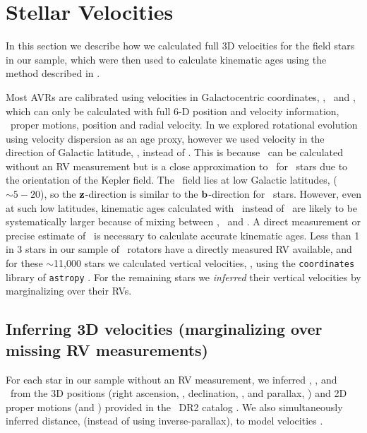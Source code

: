 \section{Stellar Velocities}
\label{sec:velocities}

In this section we describe how we calculated full 3D velocities for the field
stars in our sample, which were then used to calculate kinematic ages using
the method described in \citet{lu2021}.

Most AVRs are calibrated using velocities in Galactocentric coordinates, \vx,
\vy\ and \vz, which can only be calculated with full 6-D position and velocity
information, \ie\ proper motions, position and radial velocity.
In \citet{angus2020} we explored rotational evolution using velocity
dispersion as an age proxy, however we used velocity in the direction of
Galactic latitude, \vb, instead of \vz.
This is because \vb\ can be calculated without an RV measurement but is a
close approximation to \vz\ for \kepler\ stars due to the orientation of the
Kepler field.
The \kepler\ field lies at low Galactic latitudes, ($\sim 5-20$\degrees), so
the ${\bf z}$-direction is similar to the ${\bf b}$-direction for \kepler\
stars.
However, even at such low latitudes, kinematic ages calculated with \vb\
instead of \vz\ are likely to be systematically larger because of mixing
between \vz, \vx\ and \vy.
A direct measurement or precise estimate of \vz\ is necessary to calculate
accurate kinematic ages.
Less than 1 in 3 stars in our sample of \kepler\ rotators have a directly
measured RV available, and for these $\sim$11,000 stars we calculated vertical
velocities, \vz, using the {\tt coordinates} library of {\tt astropy}
\citep{astropy2013, astropy2018}.
For the remaining stars we {\it inferred} their vertical velocities by
marginalizing over their RVs.

\subsection{Inferring 3D velocities (marginalizing over missing RV
measurements)}
\label{sec:inference}

For each star in our sample without an RV measurement, we inferred \vx, \vy,
and \vz\ from the 3D positions (right ascension, \ra, declination, \dec, and
parallax, \parallax) and 2D proper motions (\mura and \mudec) provided in the
\gaia\ DR2 catalog \citep{brown2011}.
We also simultaneously inferred distance, (instead of using inverse-parallax),
to model velocities \citep[see \eg][]{bailer-jones2015, bailer-jones2018}.

